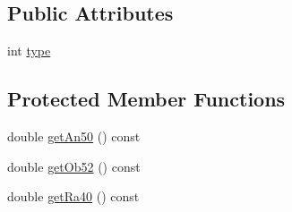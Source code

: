 \subsection*{Public Attributes}
\begin{DoxyCompactItemize}
\item 
int \hyperlink{class_d_r_w___dimension_ad3af7cb327656cb2c1c33a00d26ed933}{type}
\end{DoxyCompactItemize}
\subsection*{Protected Member Functions}
\begin{DoxyCompactItemize}
\item 
double \hyperlink{class_d_r_w___dimension_ae45501f2cad8bdcd9be874ff4f05749b}{get\+An50} () const 
\item 
double \hyperlink{class_d_r_w___dimension_a36825b8bb477ec416d20a68d3cc5d54e}{get\+Ob52} () const 
\item 
double \hyperlink{class_d_r_w___dimension_a6d8226ab5f019e2cd2f9a46c4fa7cade}{get\+Ra40} () const 
\end{DoxyCompactItemize}
